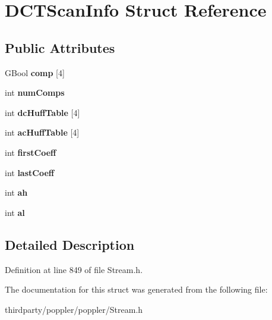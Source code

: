 \hypertarget{struct_d_c_t_scan_info}{}\section{D\+C\+T\+Scan\+Info Struct Reference}
\label{struct_d_c_t_scan_info}
\subsection*{Public Attributes}
\begin{DoxyCompactItemize}
\item 
\mbox{\label{struct_d_c_t_scan_info_a11332170b52c67f204c0d35d7e4bda06}} 
G\+Bool {\bfseries comp} \mbox{[}4\mbox{]}
\item 
\mbox{\label{struct_d_c_t_scan_info_a37a75fe94140d96c27e3cdbbeeacd79d}} 
int {\bfseries num\+Comps}
\item 
\mbox{\label{struct_d_c_t_scan_info_a22f680a170dfa3038e73d94047e9fff0}} 
int {\bfseries dc\+Huff\+Table} \mbox{[}4\mbox{]}
\item 
\mbox{\label{struct_d_c_t_scan_info_a385753187ef53dd5ff78f3273c79c22f}} 
int {\bfseries ac\+Huff\+Table} \mbox{[}4\mbox{]}
\item 
\mbox{\label{struct_d_c_t_scan_info_aabca538aff99af8686763fe5c3823f82}} 
int {\bfseries first\+Coeff}
\item 
\mbox{\label{struct_d_c_t_scan_info_a028f6d098b6ec86c48c436bd36ab50be}} 
int {\bfseries last\+Coeff}
\item 
\mbox{\label{struct_d_c_t_scan_info_a43374f63e27087a7a7642b2592382813}} 
int {\bfseries ah}
\item 
\mbox{\label{struct_d_c_t_scan_info_af7a7625d958b69b28c320c567f70991c}} 
int {\bfseries al}
\end{DoxyCompactItemize}


\subsection{Detailed Description}


Definition at line 849 of file Stream.\+h.



The documentation for this struct was generated from the following file\+:\begin{DoxyCompactItemize}
\item 
thirdparty/poppler/poppler/Stream.\+h\end{DoxyCompactItemize}
